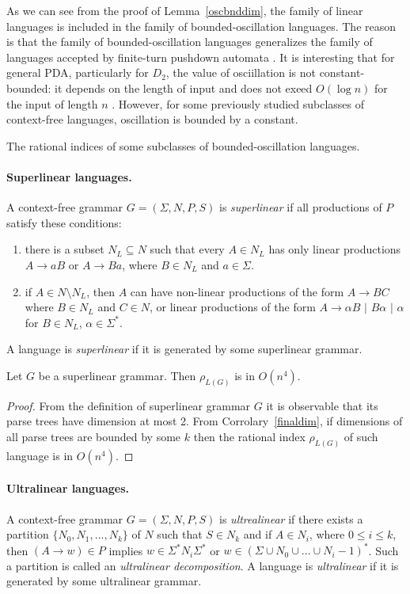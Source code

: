 As we can see from the proof of Lemma~\ref{oscbnddim}, the family of linear languages is included in the family of bounded-oscillation languages. The reason is that the family of bounded-oscillation languages generalizes the family of languages accepted by finite-turn pushdown automata \cite{BoundOsc}. It is interesting that for general PDA, particularly for $D_2$, the value of osciillation is not constant-bounded: it depends on the length of input and does not exeed $O(\log n)$ for the input of length $n$ \cite*{Gundermann, Wechsung}. However, for some previously studied subclasses of context-free languages,  oscillation is bounded by a constant.

\begin{subsection}{The rational indices of some subclasses of bounded-oscillation languages.} 

\paragraph{Superlinear languages.} 
A context-free grammar $G = (\Sigma, N, P, S)$ is \textit{superlinear} \cite{superlinear} if all productions of $P$ satisfy these conditions:
\begin{enumerate}
\item there is a subset $N_L \subseteq N$ such that every $A \in N_L$ has only linear productions $A\rightarrow aB$ or $A\rightarrow Ba$, where $B \in N_L$ and $a \in \Sigma$.
\item if $A \in N \setminus N_L$, then $A$ can have non-linear productions of the form $A \rightarrow BC$ where $B\in N_L$ and $C \in N$, or linear productions of the form $A\rightarrow \alpha B$ $\vert$ $B \alpha$ $\vert$ $\alpha$ for $B \in N_L$, $\alpha \in \Sigma^*$.
\end{enumerate}
A language is \textit{superlinear} if it is generated by some superlinear grammar. 
\begin{theorem} Let $G$ be a superlinear grammar. Then $\rho_{L(G)}$ is in $O(n^4)$.
\end{theorem}
\begin{proof}
From the definition of superlinear grammar $G$ it is observable that its parse trees have dimension at most 2. From 
Corrolary~\ref{finaldim}, if dimensions of all parse trees are bounded by some $k$ then the rational index $\rho_{L(G)}$ of such language is in $O(n^4)$.
\end{proof}
\end{subsection}
\paragraph{Ultralinear languages.} A context-free grammar $G = (\Sigma, N, P, S)$ is \textit{ultrealinear} if there exists a partition $\{N_0, N_1, ..., N_k\}$ of $N$ such that $S \in N_k$ and if $A \in N_i$, where $0 \le i \le k$, then $(A \rightarrow w) \in P$ implies $w \in \Sigma^*N_i\Sigma^*$ or $w \in {(\Sigma \cup N_0 \cup ... \cup N_i-1)}^*$. Such a partition is called an \textit{ultralinear decomposition}. A language is \textit{ultralinear} if it is generated by some ultralinear grammar. 


